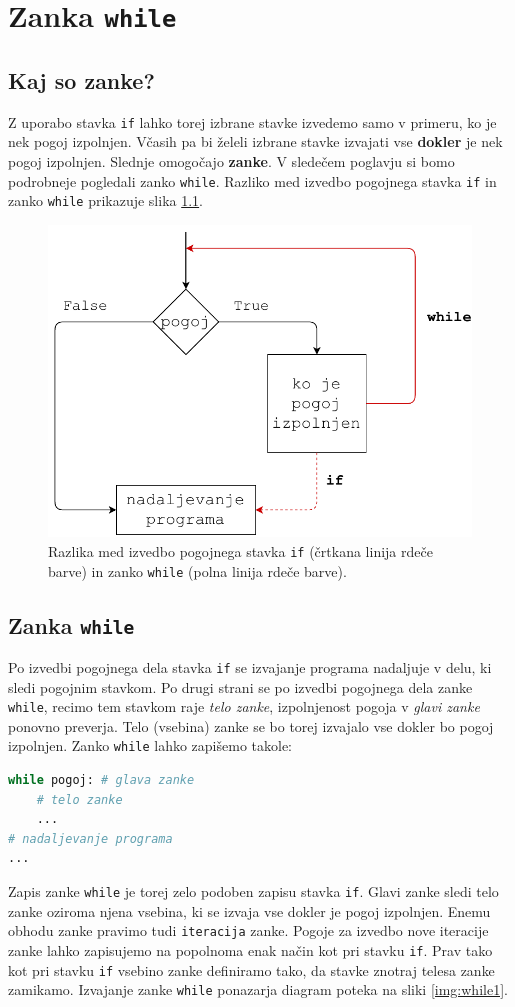\chapter{Zanka \texttt{while}}

\section{Kaj so zanke?}

Z uporabo stavka \texttt{if} lahko torej izbrane stavke izvedemo samo v primeru, ko je nek pogoj izpolnjen. Včasih pa bi želeli izbrane stavke izvajati vse \textbf{dokler}  je nek pogoj izpolnjen. Slednje omogočajo \textbf{zanke}. V sledečem poglavju si bomo podrobneje pogledali zanko \texttt{while}. Razliko med izvedbo pogojnega stavka \texttt{if} in zanko \texttt{while} prikazuje slika \ref{img:while_vs_if}.

\begin{figure}
    \centering
    \includegraphics[width=0.5\linewidth]{img/while_vs_if.pdf}
    \caption{Razlika med izvedbo pogojnega stavka \texttt{if} (črtkana linija rdeče barve) in zanko \texttt{while} (polna linija rdeče barve). }
    \label{img:while_vs_if}
\end{figure}

\section{Zanka \texttt{while}}

Po izvedbi pogojnega dela stavka \texttt{if} se izvajanje programa nadaljuje v delu, ki sledi pogojnim stavkom. Po drugi strani se po izvedbi pogojnega dela zanke \texttt{while}, recimo tem stavkom raje \emph{telo zanke}, izpolnjenost pogoja v \emph{glavi zanke} ponovno preverja. Telo (vsebina) zanke se bo torej izvajalo vse dokler bo pogoj izpolnjen. Zanko \texttt{while} lahko zapišemo takole:
\begin{lstlisting}[language=Python]
while pogoj: # glava zanke
    # telo zanke
    ...
# nadaljevanje programa
...
\end{lstlisting}
Zapis zanke \texttt{while} je torej zelo podoben zapisu stavka \texttt{if}. Glavi zanke sledi telo zanke oziroma njena vsebina, ki se izvaja vse dokler je pogoj izpolnjen. Enemu obhodu zanke pravimo tudi \texttt{iteracija} zanke. Pogoje za izvedbo nove iteracije zanke lahko zapisujemo na popolnoma enak način kot pri stavku \texttt{if}. Prav tako kot pri stavku \texttt{if} vsebino zanke definiramo tako, da stavke znotraj telesa zanke zamikamo. Izvajanje zanke \texttt{while} ponazarja diagram poteka na sliki \ref{img:while1}.

